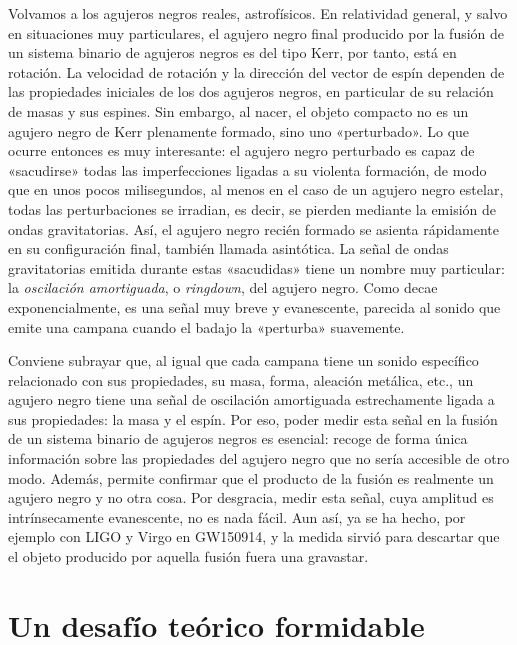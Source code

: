 Volvamos a los agujeros negros reales, astrofísicos. En relatividad general, y salvo en situaciones muy particulares, el agujero negro final producido por la fusión de un sistema binario de agujeros negros es del tipo Kerr, por tanto, está en rotación. La velocidad de rotación y la dirección del vector de espín dependen de las propiedades iniciales de los dos agujeros negros, en particular de su relación de masas y sus espines. Sin embargo, al nacer, el objeto compacto no es un agujero negro de Kerr plenamente formado, sino uno «perturbado». Lo que ocurre entonces es muy interesante: el agujero negro perturbado es capaz de «sacudirse» todas las imperfecciones ligadas a su violenta formación, de modo que en unos pocos milisegundos, al menos en el caso de un agujero negro estelar, todas las perturbaciones se irradian, es decir, se pierden mediante la emisión de ondas gravitatorias. Así, el agujero negro recién formado se asienta rápidamente en su configuración final, también llamada asintótica. La señal de ondas gravitatorias emitida durante estas «sacudidas» tiene un nombre muy particular: la \emph{oscilación amortiguada}, o \emph{ringdown}, del agujero negro. Como decae exponencialmente, es una señal muy breve y evanescente, parecida al sonido que emite una campana cuando el badajo la «perturba» suavemente.

Conviene subrayar que, al igual que cada campana tiene un sonido específico relacionado con sus propiedades, su masa, forma, aleación metálica, etc., un agujero negro tiene una señal de oscilación amortiguada estrechamente ligada a sus propiedades: la masa y el espín. Por eso, poder medir esta señal en la fusión de un sistema binario de agujeros negros es esencial: recoge de forma única información sobre las propiedades del agujero negro que no sería accesible de otro modo. Además, permite confirmar que el producto de la fusión es realmente un agujero negro y no otra cosa. Por desgracia, medir esta señal, cuya amplitud es intrínsecamente evanescente, no es nada fácil. Aun así, ya se ha hecho, por ejemplo con LIGO y Virgo en GW150914, y la medida sirvió para descartar que el objeto producido por aquella fusión fuera una gravastar.

\section{Un desafío teórico formidable}\label{sec:08-numerics}

